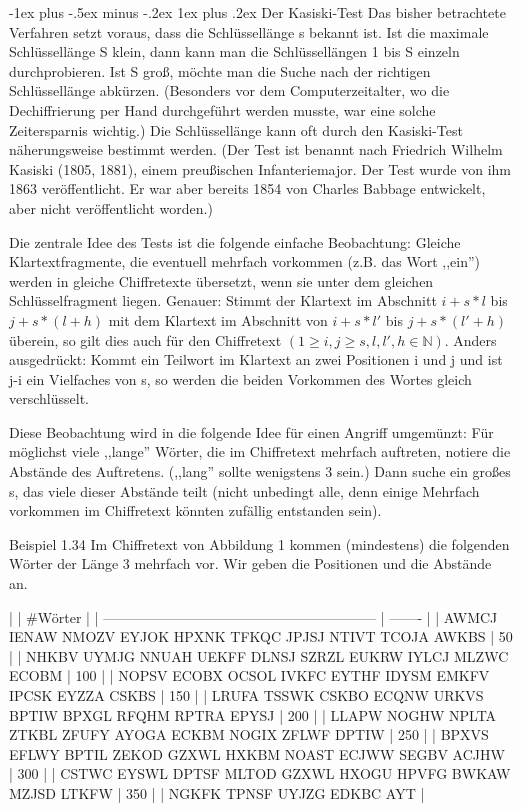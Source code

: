 \documentclass[a4paper]{article}
\makeatletter
\renewcommand{\subsubsection}{\@startsection{subsubsection}{3}{0mm}%
 {-1ex plus -.5ex minus -.2ex}%
 {1ex plus .2ex}%
 {\normalfont\small\bfseries}}
\makeatother
\begin{document}
\begin{multicols}{3}
    \subsubsection{Der Kasiski-Test}
    Das bisher betrachtete Verfahren setzt voraus, dass die Schlüssellänge s bekannt ist. Ist die maximale Schlüssellänge S klein, dann kann man die Schlüssellängen 1 bis S einzeln durchprobieren. Ist S groß, möchte man die Suche nach der richtigen Schlüssellänge abkürzen. (Besonders vor dem Computerzeitalter, wo die Dechiffrierung per Hand durchgeführt werden musste, war eine solche Zeitersparnis wichtig.) Die Schlüssellänge kann oft durch den Kasiski-Test näherungsweise bestimmt werden. (Der Test ist benannt nach Friedrich Wilhelm Kasiski (1805, 1881), einem preußischen Infanteriemajor. Der Test wurde von ihm 1863 veröffentlicht. Er war aber bereits 1854 von Charles Babbage entwickelt, aber nicht veröffentlicht worden.)

    Die zentrale Idee des Tests ist die folgende einfache Beobachtung: Gleiche Klartextfragmente, die eventuell mehrfach vorkommen (z.B. das Wort ,,ein'') werden in gleiche Chiffretexte übersetzt, wenn sie unter dem gleichen Schlüsselfragment liegen. Genauer: Stimmt der Klartext im Abschnitt $i+s*l$ bis $j+s*(l+h)$ mit dem Klartext im Abschnitt von $i+s*l'$ bis $j+s*(l'+h)$ überein, so gilt dies auch für den Chiffretext $(1\geq i,j\geq s,l,l',h\in\mathbb{N})$.
    Anders ausgedrückt: Kommt ein Teilwort im Klartext an zwei Positionen i und j und ist j-i ein Vielfaches von s, so werden die beiden Vorkommen des Wortes gleich verschlüsselt.

    Diese Beobachtung wird in die folgende Idee für einen Angriff umgemünzt: Für möglichst viele ,,lange'' Wörter, die im Chiffretext mehrfach auftreten, notiere die Abstände des Auftretens. (,,lang'' sollte wenigstens 3 sein.) Dann suche ein großes s, das viele dieser Abstände teilt (nicht unbedingt alle, denn einige Mehrfach vorkommen im Chiffretext könnten zufällig entstanden sein).

    Beispiel 1.34 Im Chiffretext von Abbildung 1 kommen (mindestens) die folgenden Wörter der Länge 3  mehrfach vor. Wir geben die Positionen und die Abstände an.

    |                                                             | \#Wörter |
    | ----------------------------------------------------------- | ------- |
    | AWMCJ IENAW NMOZV EYJOK HPXNK TFKQC JPJSJ NTIVT TCOJA AWKBS | 50      |
    | NHKBV UYMJG NNUAH UEKFF DLNSJ SZRZL EUKRW IYLCJ MLZWC ECOBM | 100     |
    | NOPSV ECOBX OCSOL IVKFC EYTHF IDYSM EMKFV IPCSK EYZZA CSKBS | 150     |
    | LRUFA TSSWK CSKBO ECQNW URKVS BPTIW BPXGL RFQHM RPTRA EPYSJ | 200     |
    | LLAPW NOGHW NPLTA ZTKBL ZFUFY AYOGA ECKBM NOGIX ZFLWF DPTIW | 250     |
    | BPXVS EFLWY BPTIL ZEKOD GZXWL HXKBM NOAST ECJWW SEGBV ACJHW | 300     |
    | CSTWC EYSWL DPTSF MLTOD GZXWL HXOGU HPVFG BWKAW MZJSD LTKFW | 350     |
    | NGKFK TPNSF UYJZG EDKBC AYT                                 |


\end{multicols}
\end{document}
